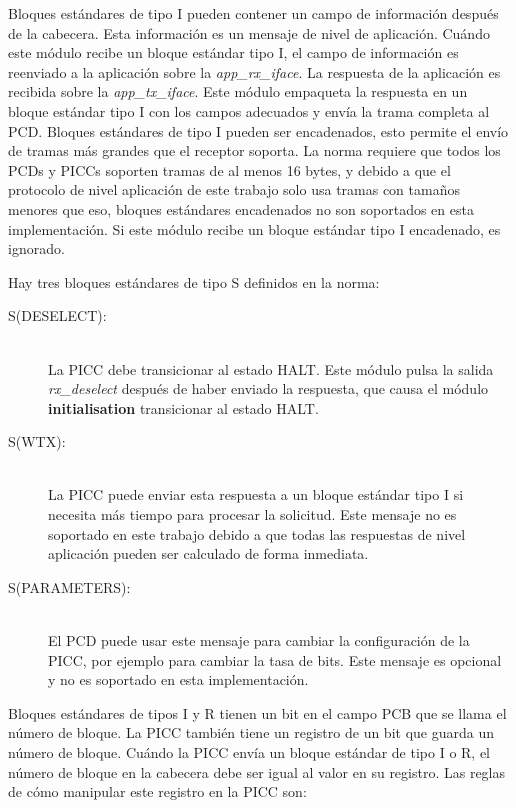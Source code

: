 \documentclass[a4paper, twoside, 11pt]{report}
\begin{document}
Bloques estándares de tipo I pueden contener un campo de información después de la cabecera. Esta información es un mensaje de nivel de aplicación. Cuándo este módulo recibe un bloque estándar tipo I, el campo de información es reenviado a la aplicación sobre la \textit{app\_rx\_iface}. La respuesta de la aplicación es recibida sobre la \textit{app\_tx\_iface}. Este módulo empaqueta la respuesta en un bloque estándar tipo I con los campos adecuados y envía la trama completa al PCD. Bloques estándares de tipo I pueden ser encadenados, esto permite el envío de tramas más grandes que el receptor soporta. La norma requiere que todos los PCDs y PICCs soporten tramas de al menos 16 bytes, y debido a que el protocolo de nivel aplicación de este trabajo solo usa tramas con tamaños menores que eso, bloques estándares encadenados no son soportados en esta implementación. Si este módulo recibe un bloque estándar tipo I encadenado, es ignorado.

Hay tres bloques estándares de tipo S definidos en la norma:

\begin{description}
  \item[S(DESELECT):] \hfill \\ La PICC debe transicionar al estado HALT. Este módulo pulsa la salida \textit{rx\_deselect} después de haber enviado la respuesta, que causa el módulo \textbf{initialisation} transicionar al estado HALT.
  \item[S(WTX):] \hfill \\ La PICC puede enviar esta respuesta a un bloque estándar tipo I si necesita más tiempo para procesar la solicitud. Este mensaje no es soportado en este trabajo debido a que todas las respuestas de nivel aplicación pueden ser calculado de forma inmediata.
  \item[S(PARAMETERS):] \hfill \\ El PCD puede usar este mensaje para cambiar la configuración de la PICC, por ejemplo para cambiar la tasa de bits. Este mensaje es opcional y no es soportado en esta implementación.
\end{description}

Bloques estándares de tipos I y R tienen un bit en el campo PCB que se llama el número de bloque. La PICC también tiene un registro de un bit que guarda un número de bloque. Cuándo la PICC envía un bloque estándar de tipo I o R, el número de bloque en la cabecera debe ser igual al valor en su registro. Las reglas de cómo manipular este registro en la PICC son:
\end{document}
